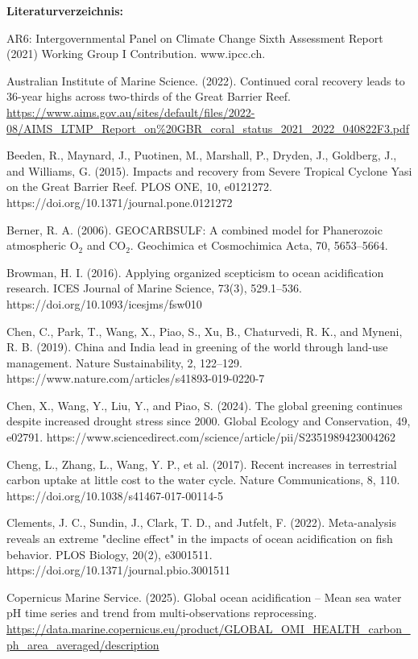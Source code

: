 \documentclass[12pt,paper=a4,DIV=12,parskip=never,chapterprefix=false,headings=standardclasses]{scrreprt}
\begin{document}
\vfill
\noindent\textbf{Literaturverzeichnis:}

\begingroup
\parindent=0pt
\everypar{\hangindent=2em\hangafter=1\relax}

AR6: Intergovernmental Panel on Climate Change Sixth Assessment Report (2021) Working Group I Contribution. www.ipcc.ch.

Australian Institute of Marine Science. (2022). Continued coral recovery leads to 36-year highs across two-thirds of the Great Barrier Reef. \url{https://www.aims.gov.au/sites/default/files/2022-08/AIMS_LTMP_Report_on\%20GBR_coral_status_2021_2022_040822F3.pdf}

Beeden, R., Maynard, J., Puotinen, M., Marshall, P., Dryden, J., Goldberg, J., and Williams, G. (2015). Impacts and recovery from Severe Tropical Cyclone Yasi on the Great Barrier Reef. PLOS ONE, 10, e0121272. https://doi.org/10.1371/journal.pone.0121272

Berner, R. A. (2006). GEOCARBSULF: A combined model for Phanerozoic atmospheric O$_2$ and CO$_2$. Geochimica et Cosmochimica Acta, 70, 5653–5664.

Browman, H. I. (2016). Applying organized scepticism to ocean acidification research. ICES Journal of Marine Science, 73(3), 529.1–536. https://doi.org/10.1093/icesjms/fsw010

Chen, C., Park, T., Wang, X., Piao, S., Xu, B., Chaturvedi, R. K., and Myneni, R. B. (2019). China and India lead in greening of the world through land-use management. Nature Sustainability, 2, 122–129. https://www.nature.com/articles/s41893-019-0220-7

Chen, X., Wang, Y., Liu, Y., and Piao, S. (2024). The global greening continues despite increased drought stress since 2000. Global Ecology and Conservation, 49, e02791. https://www.sciencedirect.com/science/article/pii/S2351989423004262

Cheng, L., Zhang, L., Wang, Y. P., et al. (2017). Recent increases in terrestrial carbon uptake at little cost to the water cycle. Nature Communications, 8, 110. https://doi.org/10.1038/s41467-017-00114-5

Clements, J. C., Sundin, J., Clark, T. D., and Jutfelt, F. (2022). Meta-analysis reveals an extreme "decline effect" in the impacts of ocean acidification on fish behavior. PLOS Biology, 20(2), e3001511. https://doi.org/10.1371/journal.pbio.3001511

Copernicus Marine Service. (2025). Global ocean acidification – Mean sea water pH time series and trend from multi-observations reprocessing. \url{https://data.marine.copernicus.eu/product/GLOBAL_OMI_HEALTH_carbon_ph_area_averaged/description}
\end{document}
